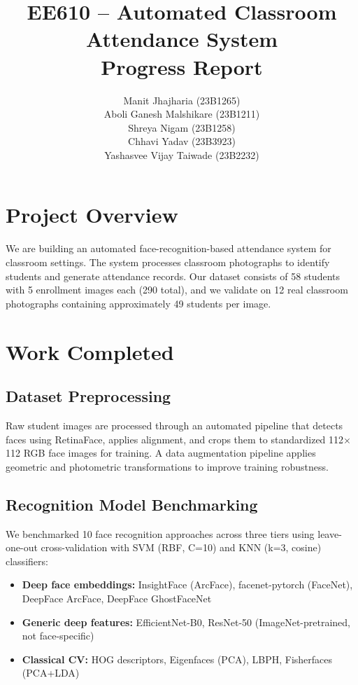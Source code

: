 \documentclass[12pt,a4paper]{article}
\title{\textbf{EE610 -- Automated Classroom Attendance System} \\ \large Progress Report}
\author{
Manit Jhajharia (23B1265) \\
Aboli Ganesh Malshikare (23B1211) \\
Shreya Nigam (23B1258) \\
Chhavi Yadav (23B3923) \\
Yashasvee Vijay Taiwade (23B2232)
}
\date{}
\begin{document}
\maketitle

\section{Project Overview}

We are building an automated face-recognition-based attendance system for classroom settings. The system processes classroom photographs to identify students and generate attendance records. Our dataset consists of 58 students with 5 enrollment images each (290 total), and we validate on 12 real classroom photographs containing approximately 49 students per image.

\section{Work Completed}

\subsection{Dataset Preprocessing}
Raw student images are processed through an automated pipeline that detects faces using RetinaFace, applies alignment, and crops them to standardized 112$\times$112 RGB face images for training. A data augmentation pipeline applies geometric and photometric transformations to improve training robustness.

\subsection{Recognition Model Benchmarking}
We benchmarked 10 face recognition approaches across three tiers using leave-one-out cross-validation with SVM (RBF, C=10) and KNN (k=3, cosine) classifiers:

\begin{itemize}[nosep]
    \item \textbf{Deep face embeddings:} InsightFace (ArcFace), facenet-pytorch (FaceNet), DeepFace ArcFace, DeepFace GhostFaceNet
    \item \textbf{Generic deep features:} EfficientNet-B0, ResNet-50 (ImageNet-pretrained, not face-specific)
    \item \textbf{Classical CV:} HOG descriptors, Eigenfaces (PCA), LBPH, Fisherfaces (PCA+LDA)
\end{itemize}
\end{document}

